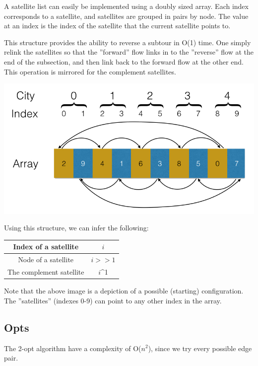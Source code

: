 \documentclass[paper=a4, fontsize=11pt,numbers=endperiod]{scrartcl} %
\numberwithin{equation}{section} %
\numberwithin{figure}{section} %
\numberwithin{table}{section} %
\begin{document}
A satellite list can easily be implemented using a doubly sized array.
Each index corresponds to a satellite, and satellites are grouped in pairs by node.
The value at an index is the index of the satellite that the current satellite points to.

This structure provides the ability to reverse a subtour in O(1) time.
One simply relink the satellites so that the ''forward'' flow links in to the ''reverse'' flow at the end of the subsection, and then link back to the forward flow at the other end.
This operation is mirrored for the complement satellites.


\begin{center}
\includegraphics[scale=0.3]{satellite}
\end{center}

Using this structure, we can infer the following:\\
\begin{table}[h]
  \centering
  \begin{tabular}{|c|c|}
    \hline
    Index of a satellite & $i$ \\ \hline
    Node of a satellite & $i>>1$ \\ \hline
    The complement satellite & $i$\^{}1 \\ \hline
  \end{tabular}
\end{table}


Note that the above image is a depiction of a possible (starting) configuration. The ''satellites'' (indexes 0-9) can point to any other index in the array.

\subsection{Opts}
The 2-opt algorithm have a complexity of O($n^2$), since we try every possible edge pair.
\end{document}
